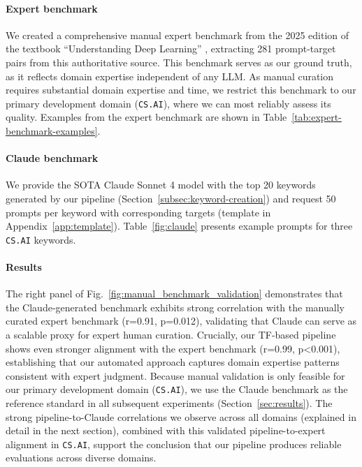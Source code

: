 \documentclass[10pt]{article}
\begin{document}
\paragraph{Expert benchmark} We created a comprehensive manual expert benchmark from the 2025 edition of the textbook ``Understanding Deep Learning'' \citep{prince2023understanding}, extracting 281 prompt-target pairs from this authoritative source. This benchmark serves as our ground truth, as it reflects domain expertise independent of any LLM. As manual curation requires substantial domain expertise and time, we restrict this benchmark to our primary development domain (\texttt{CS.AI}), where we can most reliably assess its quality. Examples from the expert benchmark are shown in 
Table~\ref{tab:expert-benchmark-examples}.

\paragraph{Claude benchmark} We provide the SOTA Claude Sonnet 4 model \citep{anthropic_models} with the top 20 keywords generated by our pipeline (Section~\ref{subsec:keyword-creation}) and request 50 prompts per keyword with corresponding targets (template in Appendix~\ref{app:template}). Table~\ref{fig:claude} presents example prompts for three \texttt{CS.AI} keywords.

\paragraph{Results} The right panel of Fig.~\ref{fig:manual_benchmark_validation} demonstrates that the Claude-generated benchmark exhibits strong correlation with the manually curated expert benchmark (r=0.91, p=0.012), validating that Claude can serve as a scalable proxy for expert human curation. Crucially, our TF-based pipeline shows even stronger alignment with the expert benchmark (r=0.99, p<0.001), establishing that our automated approach captures domain expertise patterns consistent with expert judgment. Because manual validation is only feasible for our primary development domain (\texttt{CS.AI}), we use the Claude benchmark as the reference standard in all subsequent experiments (Section~\ref{sec:results}). The strong pipeline-to-Claude correlations we observe across all domains (explained in detail in the next section), combined with this validated pipeline-to-expert alignment in \texttt{CS.AI}, support the conclusion that our pipeline produces reliable evaluations across diverse domains.
\end{document}
